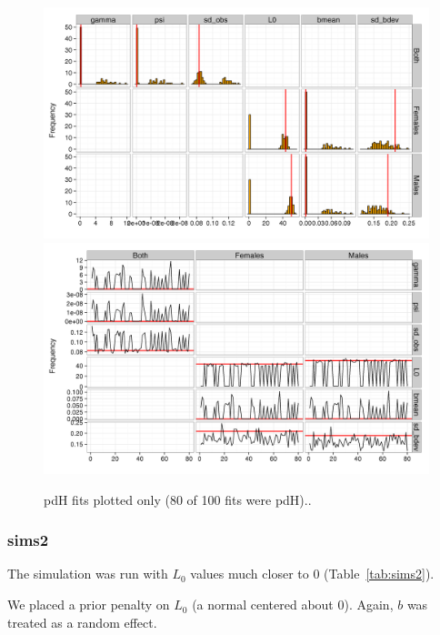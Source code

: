 \documentclass[11pt, a4paper]{article}
\begin{document}
\begin{figure}[!htbp]
  \centering
  \includegraphics[width=\linewidth]{../simulation/sims1/results/SimPars.png}
  \includegraphics[width=\linewidth]{../simulation/sims1/results/TracePars.png}
  \begin{quote}
    \caption{pdH fits plotted only (80 of 100 fits were pdH)..}
    \label{fig:sims1}
  \end{quote}
\end{figure}


\newpage\clearpage
\subsubsection{sims2}
The simulation was run with $L_0$ values much closer to 0
(Table~\ref{tab:sims2}).

We placed a prior penalty on $L_0$ (a normal centered about 0).  Again, $b$ was
treated as a random effect.
\end{document}

